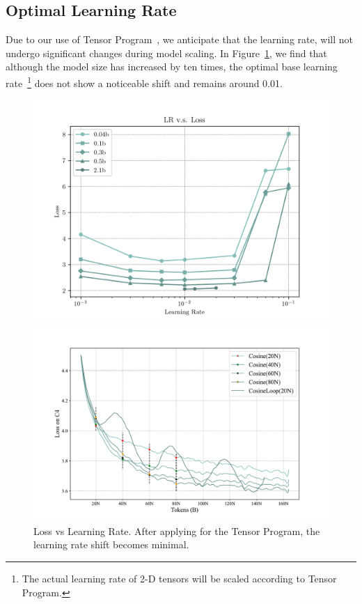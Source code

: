 \subsection{Optimal Learning Rate}
Due to our use of Tensor Program~\citep{yang2022tensor, yang2023tensor}, we anticipate that the learning rate, will not undergo significant changes during model scaling. In Figure~\ref{fig:loss_vs_lr}, we find that although the model size has increased by ten times, the optimal base learning rate~\footnote{The actual learning rate of 2-D tensors will be scaled according to Tensor Program.} does not show a noticeable shift and remains around 0.01.

\vspace{-3mm}
\begin{figure}[htbp]
    \centering
    \begin{minipage}{0.46\linewidth}
        \centering
        \includegraphics[width=0.9\linewidth]{Fig/loss_vs_lr.png}
        \caption{Loss vs Learning Rate. After applying for the Tensor Program, the learning rate shift becomes minimal.}
        \label{fig:loss_vs_lr}
    \end{minipage}
    \hfill %
    \begin{minipage}{0.46\linewidth}
        \centering
        \includegraphics[width=1.0\linewidth]{Fig/cosine_2024-03-26_15-36-16.pdf}

\end{minipage}
\end{figure}
